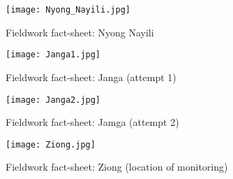 \begin{figure}[h!]
 \centering\texttt{[image: Nyong\_Nayili.jpg]}
 \captionsetup{justification=centering}
 \caption{Fieldwork fact-sheet: Nyong Nayili}
 \label{fig:Nyong_Nayili}
\end{figure} 

\begin{figure}[h!]
 \centering\texttt{[image: Janga1.jpg]}
 \captionsetup{justification=centering}
 \caption{Fieldwork fact-sheet: Janga (attempt 1)}
 \label{fig:Janga1}
\end{figure} 

\begin{figure}[h!]
 \centering\texttt{[image: Janga2.jpg]}
 \captionsetup{justification=centering}
 \caption{Fieldwork fact-sheet: Jamga (attempt 2)}
 \label{fig:Janga2}
\end{figure} 

\begin{figure}[h!]
 \centering\texttt{[image: Ziong.jpg]}
 \captionsetup{justification=centering}
 \caption{Fieldwork fact-sheet: Ziong (location of monitoring)}
 \label{fig:Ziong}
\end{figure} 